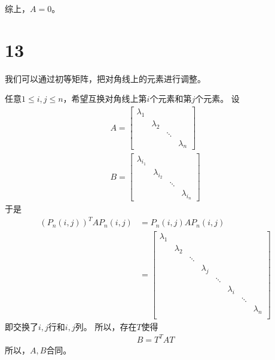 \documentclass{article}
\begin{document}
综上，$A = 0$。

\section*{13}

我们可以通过初等矩阵，把对角线上的元素进行调整。

任意$1 \leq i, j \leq n$，希望互换对角线上第$i$个元素和第$j$个元素。
设
\begin{align*}
  A = \begin{bmatrix}
        \lambda_1                         \\
         & \lambda_2                      \\
         &           & \ddots             \\
         &           &        & \lambda_n
      \end{bmatrix} \\
  B = \begin{bmatrix}
        \lambda_{i_1}                             \\
         & \lambda_{i_2}                          \\
         &               & \ddots                 \\
         &               &        & \lambda_{i_n}
      \end{bmatrix}
\end{align*}
于是
\begin{align*}
  (P_n(i, j))^T A P_n(i, j)
   & = P_n(i, j) A P_n(i, j)                                                       \\
   & = \begin{bmatrix}
         \lambda_1                                                                   \\
          & \lambda_2                                                                \\
          &           & \ddots                                                       \\
          &           &        & \lambda_j                                           \\
          &           &        &           & \ddots                                  \\
          &           &        &           &        & \lambda_i                      \\
          &           &        &           &        &           & \ddots             \\
          &           &        &           &        &           &        & \lambda_n \\
       \end{bmatrix}
\end{align*}
即交换了$i, j$行和$i, j$列。
所以，存在$T$使得
\begin{align*}
  B = T^T A T
\end{align*}
所以，$A, B$合同。
\end{document}
